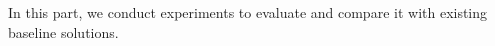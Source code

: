 
In this part, we conduct experiments to evaluate \name{} and compare it with existing baseline solutions. 





